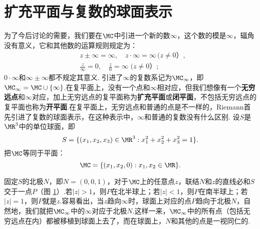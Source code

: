 \section{扩充平面与复数的球面表示\label{sec1.3}}
为了今后讨论的需要，我们要在$\MC$中引进一个新的数$\infty$，这个数的模是$\infty$，辐角没有意义，它和其他数的运算规则规定为：
\begin{align*}
  &z\pm\infty=\infty,\quad z\cdot \infty=\infty\,\mbox{($z\ne0$）},\\
  &\frac z{\infty}=0,\quad \frac z0=\infty\;\mbox{($z\ne0$）};
\end{align*}
$0\cdot \infty$和$\infty\pm\infty$都不规定其意义. 引进了$\infty$的复数系记为$\MC_{\infty} $，即$\MC_{\infty}=\MC\cup\{\infty\}$.在复平面上，没有一个点和$\infty$相对应，但我们想像有一个\textbf{无穷远点}和$\infty$对应，加上无穷远点的复平面称为\textbf{扩充平面}或\textbf{闭平面}，不包括无穷远点的复平面也称为\textbf{开平面}.在复平面上，无穷远点和普通的点是不一样的，Riemann首先引进了复数的球面表示，在这种表示中，$\infty$和普通的复数没有什么区别. 设$S$是$\MR^3$中的单位球面，即
  \[S=\{(x_1,x_2,x_3)\in\MR^3:x_1^2+x_2^2+x_3^2=1\}.\]
把$\MC$等同于平面：
  \[\MC=\{(x_1,x_2,0):x_1,x_2\in\MR\}.\]
\begin{figure}[!ht]
\centering
{}
\caption{}\label{fig1.8}
\end{figure}
固定$S$的北极$N$，即$N=(0,0,1)$，对于$\MC$上的任意点$z$，联结$N$和$z$的直线必和$S$交于一点$P$（图 \ref{fig1.8}）.若$|z|>1$，则$P$在北半球上；若$|z|<1$，则$P$在南半球上；若$|z|=1$，则$P$就是$z$.容易看出，当$z$趋向$\infty$时，球面上对应的点$P$趋向于北极$N$，自然地，我们就把$\MC_\infty$中的$\infty$对应于北极$N$.这样一来，$\MC_\infty$中的所有点（包括无穷远点在内）都被移植到球面上去了，而在球面上，$N$和其他的点是一视同仁的.

